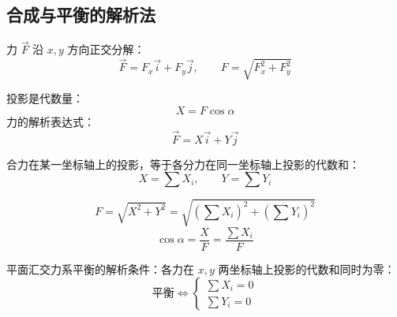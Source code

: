 \subsection{合成与平衡的解析法}

 力 $\vec{F}$ 沿 $x,y$ 方向正交分解：
\begin{equation}
\vec{F}=F_x\vec{i}+F_y\vec{j},\qquad F=\sqrt{F_x^2+F_y^2}
\label{eq:2-解析-正交分解}
\end{equation}

 投影是代数量：
\begin{equation}
\boxed{\;X=F\cos\alpha\;}
\label{eq:2-解析-投影}
\end{equation}
力的解析表达式：
\begin{equation}
\boxed{\;\vec{F}=X\vec{i}+Y\vec{j}\;}
\label{eq:2-解析-表达式}
\end{equation}

 合力在某一坐标轴上的投影，等于各分力在同一坐标轴上投影的代数和：
\begin{equation}
X=\sum X_i,\qquad Y=\sum Y_i
\label{eq:2-解析-合力投影}
\end{equation}

\begin{equation}
F=\sqrt{X^2+Y^2}=\sqrt{\left(\sum X_i\right)^2+\left(\sum Y_i\right)^2}
\label{eq:2-解析-合力大小}
\end{equation}
\begin{equation}
\cos\alpha=\frac{X}{F}=\frac{\sum X_i}{F}
\label{eq:2-解析-合力方向}
\end{equation}

 平面汇交力系平衡的解析条件：各力在 $x,y$ 两坐标轴上投影的代数和同时为零：
\begin{equation}
\boxed{\;\text{平衡}\iff
\begin{cases}\sum X_i=0\\ \sum Y_i=0\end{cases}\;}
\label{eq:2-解析-平衡}
\end{equation}

